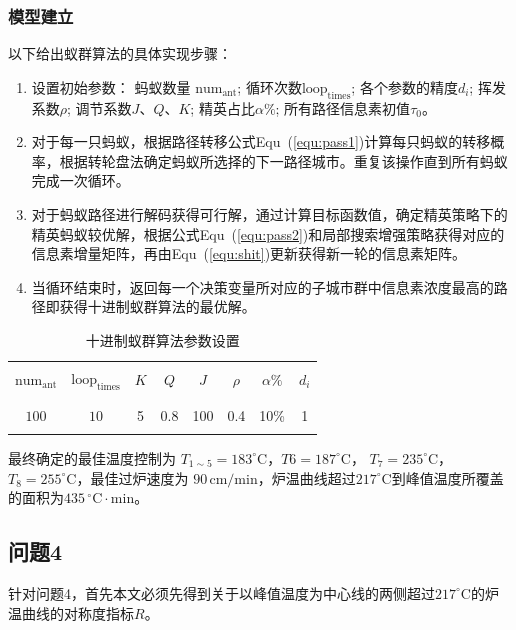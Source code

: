 \documentclass[../main.tex]{subfiles}
\begin{document}
\subsubsection{模型建立}
以下给出蚁群算法的具体实现步骤：
\begin{enumerate}
	\item 设置初始参数：
	蚂蚁数量 \(\mathrm{num}_{\mathrm{ant}}\); 循环次数\(\mathrm{loop}_{\mathrm{times}}\); 各个参数的精度\(d_i\); 挥发系数\(\rho\); 调节系数\(J\)、\(Q\)、\(K\); 精英占比\(\alpha  \%\); 所有路径信息素初值\(τ_0\)。
	\item 对于每一只蚂蚁，根据路径转移公式Equ~(\ref{equ:pass1})计算每只蚂蚁的转移概率，根据转轮盘法确定蚂蚁所选择的下一路径城市。重复该操作直到所有蚂蚁完成一次循环。
	\item 对于蚂蚁路径进行解码获得可行解，通过计算目标函数值，确定精英策略下的精英蚂蚁较优解，根据公式Equ~(\ref{equ:pass2})和局部搜索增强策略获得对应的信息素增量矩阵，再由Equ~(\ref{equ:shit})更新获得新一轮的信息素矩阵。
	\item 当循环结束时，返回每一个决策变量所对应的子城市群中信息素浓度最高的路径即获得十进制蚁群算法的最优解。
\end{enumerate}
\begin{table}[H]
	\centering
	\begin{tabular}{cccccccc}
	\hline 	\hline
	\\[-1em]
	\(\mathrm{num}_{\mathrm{ant}}\) & \(\mathrm{loop}_{\mathrm{times}}\) & \(K\) & \(Q\) & \(J\) & \(\rho\) & \(\alpha\%\) & \(d_{i}\) \\
	\\[-1em]
	\hline
	\\[-1em]
	\(100\)  & \(10\)  & 5  & 0.8  & 100  & 0.4  & 10\%  & 1
	\\[-1em]
	\\ \hline
	\end{tabular}
	\caption{十进制蚁群算法参数设置}
\end{table}
最终确定的最佳温度控制为 \(T _{1 \sim 5}= 183 ^{\circ}\mathrm{C}\)，\(T6 = 187^{\circ}\mathrm{C}\)，
\(T_{7} = 235^{\circ}\mathrm{C}\)，\(T_8 = 255^{\circ}\mathrm{C}\)，最佳过炉速度为 \(90\,\mathrm{cm}/\mathrm{min}\)，炉温曲线超过\(217 ^{\circ}\mathrm{C}\)到峰值温度所覆盖的面积为\(435\,^{\circ}\mathrm{C} \cdot \mathrm{min}\)。

\subsection{问题4}
针对问题4，首先本文必须先得到关于以峰值温度为中心线的两侧超过\(217^{\circ}\mathrm{C}\)的炉温曲线的对称度指标\(R\)。
\end{document}
